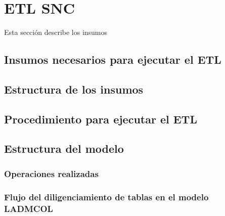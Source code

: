 \documentclass[letterpaper,10pt,spanish]{sphinxmanual}
\begin{document}
\chapter{ETL SNC}
\label{\detokenize{ETL SNC:etl-snc}}\label{\detokenize{ETL SNC::doc}}
Esta sección describe los insumos


\section{Insumos necesarios para ejecutar el ETL}
\label{\detokenize{ETL_SNC/supplies:insumos-necesarios-para-ejecutar-el-etl}}\label{\detokenize{ETL_SNC/supplies::doc}}

\section{Estructura de los insumos}
\label{\detokenize{ETL_SNC/Structure:estructura-de-los-insumos}}\label{\detokenize{ETL_SNC/Structure::doc}}

\section{Procedimiento para ejecutar el ETL}
\label{\detokenize{ETL_SNC/Process:procedimiento-para-ejecutar-el-etl}}\label{\detokenize{ETL_SNC/Process::doc}}

\section{Estructura del modelo}
\label{\detokenize{ETL_SNC/Model:estructura-del-modelo}}\label{\detokenize{ETL_SNC/Model::doc}}

\subsection{Operaciones realizadas}
\label{\detokenize{ETL_SNC/Model:operaciones-realizadas}}

\subsection{Flujo del diligenciamiento de tablas en el modelo LADM\sphinxhyphen{}COL}
\label{\detokenize{ETL_SNC/Model:flujo-del-diligenciamiento-de-tablas-en-el-modelo-ladm-col}}


\renewcommand{\indexname}{Índice}
\printindex
\end{document}
